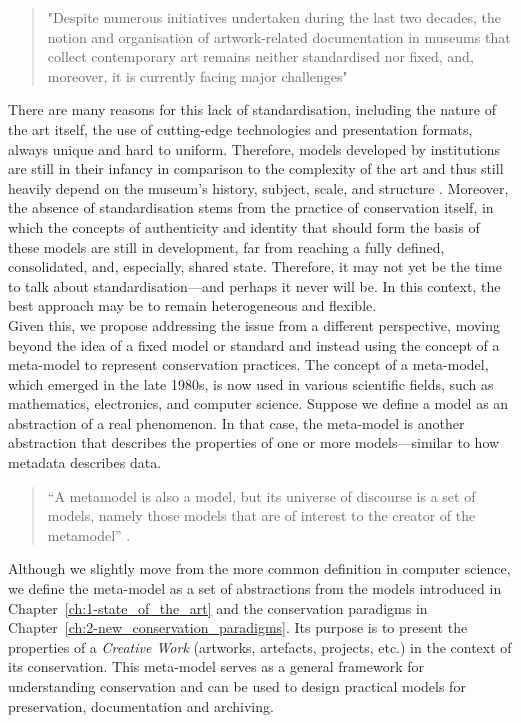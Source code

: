 \begin{quote}
    "Despite numerous initiatives undertaken during the last two decades, the notion and organisation of artwork-related documentation in museums that collect contemporary art remains neither standardised nor fixed, and, moreover, it is currently facing major challenges" \cite{wielocha2024collections}
\end{quote}
There are many reasons for this lack of standardisation, including the nature of the art itself, the use of cutting-edge technologies and presentation formats, always unique and hard to uniform. Therefore, models developed by institutions are still in their infancy in comparison to the complexity of the art and thus still heavily depend on the museum’s history, subject, scale, and structure \cite{wielocha2024collections}. Moreover, the absence of standardisation stems from the practice of conservation itself, in which the concepts of authenticity and identity that should form the basis of these models are still in development, far from reaching a fully defined, consolidated, and, especially, shared state. Therefore, it may not yet be the time to talk about standardisation—and perhaps it never will be. In this context, the best approach may be to remain heterogeneous and flexible.\\
Given this, we propose addressing the issue from a different perspective, moving beyond the idea of a fixed model or standard and instead using the concept of a meta-model to represent conservation practices. The concept of a meta-model, which emerged in the late 1980s, is now used in various scientific fields, such as mathematics, electronics, and computer science. Suppose we define a model as an abstraction of a real phenomenon. In that case, the meta-model is another abstraction that describes the properties of one or more models—similar to how metadata describes data.
\begin{quote}
“A metamodel is also a model, but its universe of discourse is a set of models, namely those models that are of interest to the creator of the metamodel” \cite{Liu2009-od}.    
\end{quote}
Although we slightly move from the more common definition in computer science, we define the meta-model as a set of abstractions from the models introduced in Chapter~\ref{ch:1-state_of_the_art} and the conservation paradigms in Chapter~\ref{ch:2-new_conservation_paradigms}. Its purpose is to present the properties of a \textit{Creative Work} (artworks, artefacts, projects, etc.) in the context of its conservation. This meta-model serves as a general framework for understanding conservation and can be used to design practical models for preservation, documentation and archiving.\\
